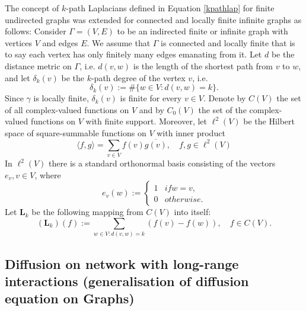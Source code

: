 \documentclass[10pt,a4paper]{article}
\begin{document}
    	The concept of $k$-path Laplacians defined in Equation \ref{kpathlap} for finite undirected graphs was extended for connected and locally finite infinite graphs as follows:
    	Consider $\Gamma = (V,E)$ to be an indirected finite or infinite graph with vertices $V$ and edges $E$. We assume that $\Gamma$ is connected and locally finite that is to say each vertex has only finitely many edges emanating from it. Let $d$ be the distance metric on $\Gamma$, i.e. $d(v,w)$ is the length of the shortest path from $v$ to $w$, and let $\delta_{k}(v)$ be the $k$-path degree of the vertex $v$, i.e.
    	\begin{equation}
    	\delta_{k}(v) := \#\{w \in V : d(v,w) = k\}.
    	\end{equation}
    	Since $\gamma$ is locally finite, $\delta_{k}(v)$ is finite for every $v \in V$. Denote by $C(V)$ the set of all complex-valued functions on $V$ and by $C_{0}(V)$ the set of the complex-valued functions on $V$ with finite support. Moreover, let $\ell^2(V)$ be the Hilbert space of square-summable functions on $V$ with inner product
    	\begin{equation}
    	\langle f,g\rangle = \sum_{v\in V} f(v) \overline{g(v)}, \quad f,g \in \ell^2(V) 
    	\end{equation}
    	In $\ell^2(V)$ there is a standard orthonormal basis consisting of the vectors $e_v, v\in V$, where
    	\begin{equation}
    	e_v(w) :=  \begin{cases*}
    	1 & if  w = v,  \\
    	0 & otherwise.
    	\end{cases*}
    	\end{equation}
    	Let $\mathbf{L}_{k}$ be the following mapping from $C(V)$ into itself:
    	\begin{equation}
    	(\mathbf{L}_{k}) (f) := \sum_{w\in V: d(v,w)=k} (f(v) -f(w)), \quad f \in C(V).
    	\label{infinite-dif}
    	\end{equation}
    	
    	\subsection{Diffusion on network with long-range interactions (generalisation of diffusion equation on Graphs) }
    	
\end{document}
